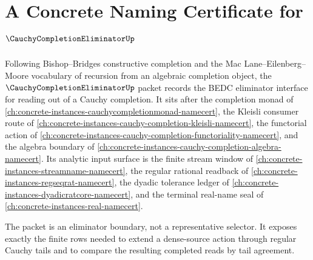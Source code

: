 \chapter{A Concrete Naming Certificate for $\CauchyCompletionEliminatorUp$}
\label{ch:concrete-instances-cauchy-completion-eliminator-namecert}

Following Bishop--Bridges constructive completion and the Mac Lane--Eilenberg--Moore vocabulary of recursion from an algebraic completion object, the $\CauchyCompletionEliminatorUp$ packet records the BEDC eliminator interface for reading out of a Cauchy completion. It sits after the completion monad of \autoref{ch:concrete-instances-cauchycompletionmonad-namecert}, the Kleisli consumer route of \autoref{ch:concrete-instances-cauchy-completion-kleisli-namecert}, the functorial action of \autoref{ch:concrete-instances-cauchy-completion-functoriality-namecert}, and the algebra boundary of \autoref{ch:concrete-instances-cauchy-completion-algebra-namecert}. Its analytic input surface is the finite stream window of \autoref{ch:concrete-instances-streamname-namecert}, the regular rational readback of \autoref{ch:concrete-instances-regseqrat-namecert}, the dyadic tolerance ledger of \autoref{ch:concrete-instances-dyadicratcore-namecert}, and the terminal real-name seal of \autoref{ch:concrete-instances-real-namecert}.

The packet is an eliminator boundary, not a representative selector. It exposes exactly the finite rows needed to extend a dense-source action through regular Cauchy tails and to compare the resulting completed reads by tail agreement.

